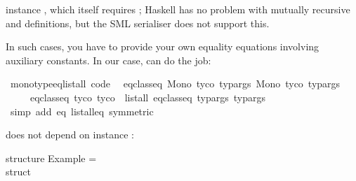 \begin{isabellebody}
\begin{isamarkuptext}
  instance , which itself requires
  ;  Haskell has no problem with mutually
  recursive  and  definitions,
  but the SML serialiser does not support this.

  In such cases, you have to provide your own equality equations
  involving auxiliary constants.  In our case,
   can do the job:%
\end{isamarkuptext}%
\isamarkuptrue%
%
\isadelimquote
%
\endisadelimquote
%
\isatagquote
{}\isamarkupfalse%
\ monotype{\isacharunderscore}eq{\isacharunderscore}list{\isacharunderscore}all{}\ {\isacharbrackleft}code{\isacharbrackright}{\isacharcolon}\isanewline
\ \ {\isachardoublequoteopen}eq{\isacharunderscore}class{\isachardot}eq\ {\isacharparenleft}Mono\ tyco{}\ typargs{}{\isacharparenright}\ {\isacharparenleft}Mono\ tyco{}\ typargs{}{\isacharparenright}\ {\isasymlongleftrightarrow}\isanewline
\ \ \ \ \ eq{\isacharunderscore}class{\isachardot}eq\ tyco{}\ tyco{}\ {\isasymand}\ list{\isacharunderscore}all{}\ eq{\isacharunderscore}class{\isachardot}eq\ typargs{}\ typargs{}{\isachardoublequoteclose}\isanewline
\ \ \isamarkupfalse%
\ {\isacharparenleft}simp\ add{\isacharcolon}\ eq\ list{\isacharunderscore}all{}{\isacharunderscore}eq\ {\isacharbrackleft}symmetric{\isacharbrackright}{\isacharparenright}%
\endisatagquote
{\isafoldquote}%
%
\isadelimquote
%
\endisadelimquote
%
\begin{isamarkuptext}%
\noindent does not depend on instance :%
\end{isamarkuptext}%
\isamarkuptrue%
%
\isadelimquote
%
\endisadelimquote
%
\isatagquote
%
\begin{isamarkuptext}%
\isaverbatim%
\noindent%
\hspace*{0pt}structure Example = \\
\hspace*{0pt}struct\\

\end{isamarkuptext}
\end{isabellebody}
